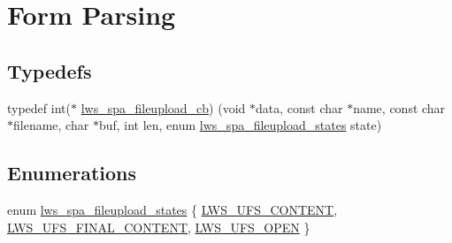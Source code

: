\hypertarget{group__form-parsing}{}\section{Form Parsing}
\label{group__form-parsing}
\subsection*{Typedefs}
\begin{DoxyCompactItemize}
\item 
typedef int($\ast$ \hyperlink{group__form-parsing_ga5a70527c0861c2ffa3d29333a6aa7f8e}{lws\+\_\+spa\+\_\+fileupload\+\_\+cb}) (void $\ast$data, const char $\ast$name, const char $\ast$filename, char $\ast$buf, int len, enum \hyperlink{group__form-parsing_ga41a74a822771d3dce89751aa3bce28ae}{lws\+\_\+spa\+\_\+fileupload\+\_\+states} state)
\end{DoxyCompactItemize}
\subsection*{Enumerations}
\begin{DoxyCompactItemize}
\item 
enum \hyperlink{group__form-parsing_ga41a74a822771d3dce89751aa3bce28ae}{lws\+\_\+spa\+\_\+fileupload\+\_\+states} \{ \hyperlink{group__form-parsing_gga41a74a822771d3dce89751aa3bce28aead3a958e7719ac273c3ba4f684f00c87f}{L\+W\+S\+\_\+\+U\+F\+S\+\_\+\+C\+O\+N\+T\+E\+NT}, 
\hyperlink{group__form-parsing_gga41a74a822771d3dce89751aa3bce28aea6ce2a55a4c3695cdb640c893d95bd3a7}{L\+W\+S\+\_\+\+U\+F\+S\+\_\+\+F\+I\+N\+A\+L\+\_\+\+C\+O\+N\+T\+E\+NT}, 
\hyperlink{group__form-parsing_gga41a74a822771d3dce89751aa3bce28aea2d25de44865bd44e5a3903a2bab9ca83}{L\+W\+S\+\_\+\+U\+F\+S\+\_\+\+O\+P\+EN}
 \}
\end{DoxyCompactItemize}
